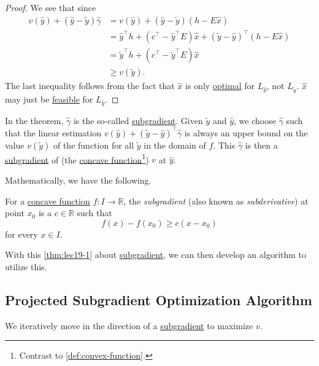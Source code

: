\begin{proof}
	We see that since
	\[
		\begin{split}
			v(\hat{y})+(\hat{y} - \widetilde{y})\hat{\gamma} & =v(\hat{y})+(\hat{y} - \widetilde{y})(h - E \hat{x})                                                      \\
			                                                 & = \hat{y}^{\top}h + (c^{\top} - \hat{y}^{\top}E)\hat{x} + (\widetilde{y} - \hat{y})^{\top}(h - E \hat{x}) \\
			                                                 & = \widetilde{y}^{\top}h + (c^{\top} - \widetilde{y}^{\top} E)\hat{x}                                      \\
			                                                 & \geq v(\widetilde{y}).
		\end{split}
	\]
	The last inequality follows from the fact that \(\hat{x}\) is only \hyperref[def:optimal-solution]{optimal} for \(L_{\hat{y}}\), not \(L_{\widetilde{y}}\). \(\hat{x}\) may just be \hyperref[def:feasible-solution]{feasible} for \(L_{\hat{y}}\).
\end{proof}

In the theorem, \(\hat{\gamma}\) is the so-called \hyperref[def:subgradient]{subgradient}. Given \(\widetilde{y}\) and \(\hat{y}\), we choose \(\hat{\gamma}\) such that the linear estimation \(v(\hat{y})+(\widetilde{y} - \hat{y})^{\top}\hat{\gamma}\) is always an upper bound on the value \(v(\widetilde{y})\) of the function for all \(\widetilde{y}\) in the domain of \(f\). This \(\hat{\gamma}\) is then a \hyperref[def:subgradient]{subgradient} of (the \hyperref[def:convex-function]{concave function}\footnote{Contrast to \autoref{def:convex-function}.}) \(v\) at \(\hat{y}\).

Mathematically, we have the following.

\begin{definition}[Subgradient]\label{def:subgradient}
	For a \hyperref[def:convex-function]{concave function} \(f\colon I\to \mathbb{R}\), the \emph{subgradient} (also known as \emph{subderivative}) at point \(x_0\) is a \(c\in \mathbb{R}\) such that
	\[
		f(x) - f(x_{0})\geq c(x - x_0)
	\]
	for every \(x\in I\).
\end{definition}

With this \autoref{thm:lec19-1} about \hyperref[def:subgradient]{subgradient}, we can then develop an algorithm to utilize this.

\subsection{Projected Subgradient Optimization Algorithm}
\begin{intuition}
	We iteratively move in the direction of a \hyperref[def:subgradient]{subgradient} to maximize \(v\).
\end{intuition}

